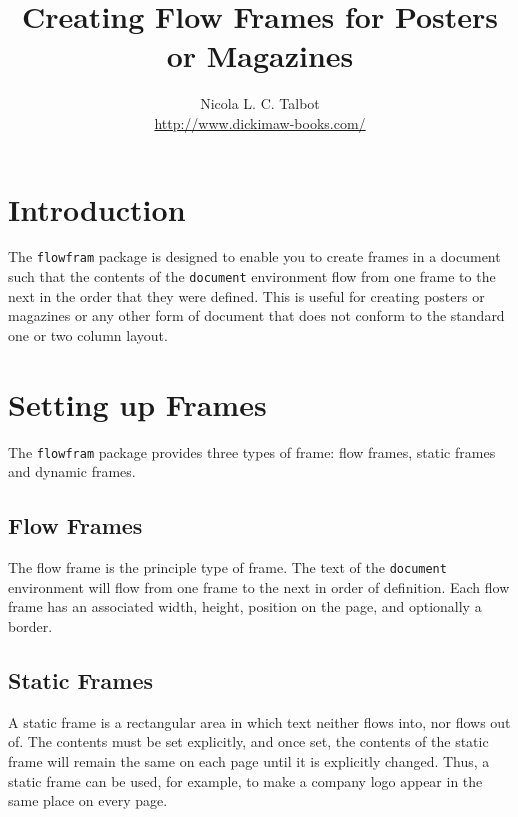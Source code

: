 \documentclass[a4paper,twoside]{report}
\newcommand{\sty}[1]{\texttt{#1}}
\newcommand{\env}[1]{\texttt{#1}}
\begin{document}
\title{Creating Flow Frames for Posters or Magazines}
\author{Nicola L. C. Talbot\\[1cm]\url{http://www.dickimaw-books.com/}}
\date{}
\maketitle

\tableofcontents

\chapter{Introduction}

The \sty{flowfram} package is designed to enable you to create
frames in a document such that the 
contents of the \env{document} environment flow from one 
frame to the next in the order that they were defined.  
This is useful for creating posters
or magazines or any other form of document that does not 
conform to the standard one or two column layout.

\chapter{Setting up Frames}

The \sty{flowfram} package provides three types of frame:
{flow frames}, {static 
frames} and {dynamic frames}.

\section{Flow Frames}

The flow frame is the principle type of frame.
The text of the \env{document} environment will flow from 
one frame to the next in order of definition. Each 
flow frame has an associated width, height, 
position on the page, and optionally a border.

\section{Static Frames}

A static frame is a rectangular area in which text neither
flows into, nor flows out of.  The contents must be set
explicitly, and once set, the contents of the static frame will
remain the same on each page until it is explicitly 
changed.  Thus, a static frame can be used, for example, to make 
a company logo appear in the same place on every page.
\end{document}
